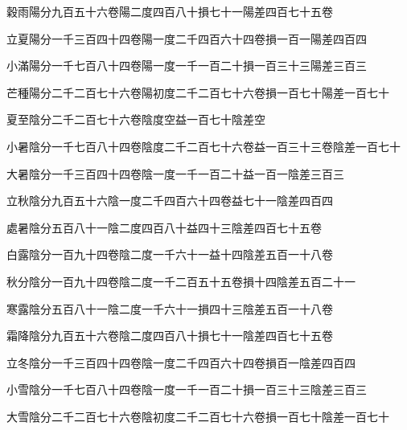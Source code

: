\begin{pinyinscope}
 穀雨陽分九百五十六卷陽二度四百八十損七十一陽差四百七十五卷



 立夏陽分一千三百四十四卷陽一度二千四百六十四卷損一百一陽差四百四



 小滿陽分一千七百八十四卷陽一度一千一百二十損一百三十三陽差三百三



 芒種陽分二千二百七十六卷陽初度二千二百七十六卷損一百七十陽差一百七十



 夏至陰分二千二百七十六卷陰度空益一百七十陰差空



 小暑陰分一千七百八十四卷陰度二千二百七十六卷益一百三十三卷陰差一百七十



 大暑陰分一千三百四十四卷陰一度一千一百二十益一百一陰差三百三



 立秋陰分九百五十六陰一度二千四百六十四卷益七十一陰差四百四



 處暑陰分五百八十一陰二度四百八十益四十三陰差四百七十五卷



 白露陰分一百九十四卷陰二度一千六十一益十四陰差五百一十八卷



 秋分陰分一百九十四卷陰二度一千二百五十五卷損十四陰差五百二十一



 寒露陰分五百八十一陰二度一千六十一損四十三陰差五百一十八卷



 霜降陰分九百五十六卷陰二度四百八十損七十一陰差四百七十五卷



 立冬陰分一千三百四十四卷陰一度二千四百六十四卷損百一陰差四百四



 小雪陰分一千七百八十四卷陰一度一千一百二十損一百三十三陰差三百三



 大雪陰分二千二百七十六卷陰初度二千二百七十六卷損一百七十陰差一百七十





\end{pinyinscope}
